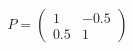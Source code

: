 \documentclass[preview]{standalone}
\begin{document}
\begin{align*}
P = \begin{pmatrix} 1 & -0.5 \\ 0.5 & 1 \end{pmatrix}
\end{align*}
\end{document}
